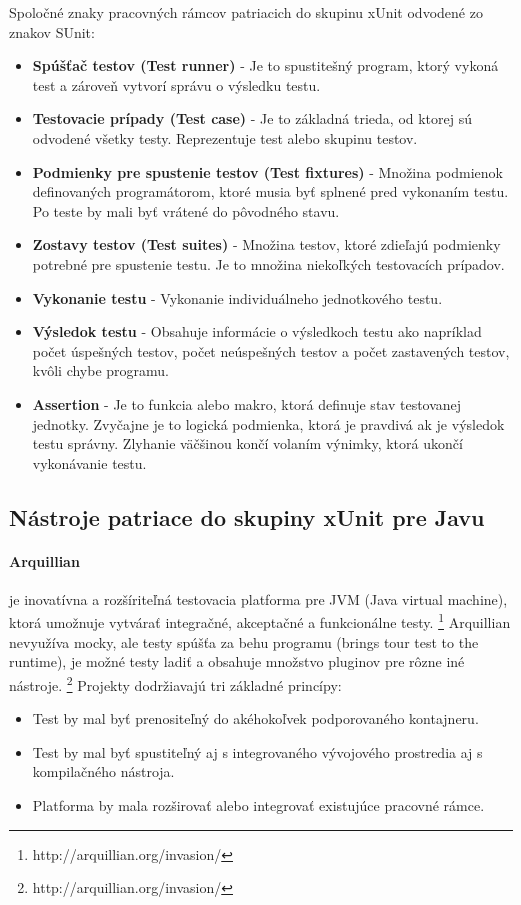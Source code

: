 \documentclass[11pt,twoside,slovak,a4paper]{article}
\begin{document}
		Spoločné znaky pracovných rámcov patriacich do skupinu xUnit odvodené zo znakov SUnit\cite{Brauer}:
		\begin{itemize}
			\item \textbf{Spúšťač testov (Test runner)} - Je to spustitešný program, ktorý vykoná test a zároveň vytvorí správu o výsledku testu.
			\item \textbf{Testovacie prípady (Test case)} - Je to základná trieda, od ktorej sú odvodené všetky testy. Reprezentuje test alebo skupinu testov.
			\item \textbf{Podmienky pre spustenie testov (Test fixtures)} - Množina podmienok definovaných programátorom, ktoré musia byť splnené pred vykonaním testu. Po teste by mali byť vrátené do pôvodného stavu.
			\item \textbf{Zostavy testov (Test suites)} - Množina testov, ktoré zdieľajú podmienky potrebné pre spustenie testu. Je to množina niekoľkých testovacích prípadov.
			\item \textbf{Vykonanie testu} - Vykonanie individuálneho jednotkového testu.
			\item \textbf{Výsledok testu} - Obsahuje informácie o výsledkoch testu ako napríklad počet úspešných testov, počet neúspešných testov a počet zastavených testov, kvôli chybe programu.
			\item \textbf{Assertion} - Je to funkcia alebo makro, ktorá definuje stav testovanej jednotky. Zvyčajne je to logická podmienka, ktorá je pravdivá ak je výsledok testu správny. Zlyhanie väčšinou končí volaním výnimky, ktorá ukončí vykonávanie testu. 
		\end{itemize}
		
	\subsection{Nástroje patriace do skupiny xUnit pre Javu}
	\paragraph{Arquillian} je inovatívna a rozšíriteľná testovacia platforma pre JVM (Java virtual machine), ktorá umožnuje vytvárať integračné, akceptačné a funkcionálne testy. \footnote{http://arquillian.org/invasion/} Arquillian nevyužíva mocky, ale testy spúšťa za behu programu (brings tour test to the runtime), je možné testy ladiť a obsahuje množstvo pluginov pre rôzne iné nástroje. \footnote{http://arquillian.org/invasion/}
	Projekty dodržiavajú tri základné princípy:
	\begin{itemize}
		\item Test by mal byť prenositeľný do akéhokoľvek podporovaného kontajneru.
		\item Test by mal byť spustiteľný aj s integrovaného vývojového prostredia aj s kompilačného nástroja.
		\item Platforma by mala rozširovať alebo integrovať existujúce pracovné rámce.
	\end{itemize}
	
\end{document}
